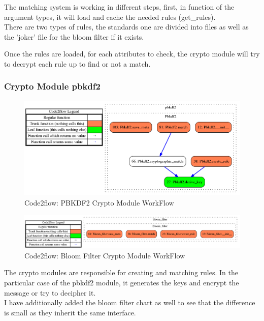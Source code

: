 \documentclass{eplmastersthesis}
\begin{document}
The matching system is working in different steps, first, in function of the argument types, it will load and cache the needed rules (get\_rules).\\
There are two types of rules, the standards one are divided into files as well as the 'joker' file for the bloom filter if it exists.

Once the rules are loaded, for each attributes to check, the crypto module will try to decrypt each rule up to find or not a match.

\subsubsection{Crypto Module \gls{pbkdf2}}

\begin{figure}[h!]
\begin{center}
	\includegraphics[scale=0.3]{res/flowPBKDF2}
	\caption{Code2flow: PBKDF2 Crypto Module WorkFlow}
	\label{code2flow-pbkdf2}
\end{center}
\end{figure}

\begin{figure}[h!]
\begin{center}
	\includegraphics[scale=0.3]{res/flowBloomFilter}
	\caption{Code2flow: Bloom Filter Crypto Module WorkFlow}
	\label{code2flow-bloom}
\end{center}
\end{figure}

The crypto modules are responsible for creating and matching rules. In the particular case of the \gls{pbkdf2} module, it generates the keys and encrypt the message or try to decipher it.\\
I have additionally added the bloom filter chart as well to see that the difference is small as they inherit the same interface.\\
\end{document}

